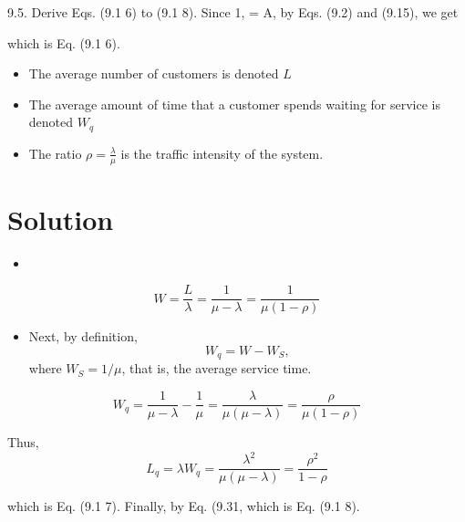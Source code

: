 \documentclass[a4paper12pt]{article}
\begin{document}
\large 




9.5. Derive Eqs. (9.1 6) to (9.1 8). 
Since 1, = A, by Eqs. (9.2) and (9.15), we get 

which is Eq. (9.1 6).

\begin{framed}
\begin{itemize}
\item The average number of customers is denoted $L$
\item The average amount of time that a customer spends waiting for service is denoted $W_q$
    \item  The ratio ${\rho = \frac{\lambda}{\mu}}$ is the traffic intensity of the system.
\end{itemize}
\end{framed}
\section*{Solution}
\begin{itemize}
    \item 
\end{itemize}
\[W =  \frac{L}{\lambda} = \frac{1}{\mu - \lambda } = \frac{1}{\mu(1-\rho)}\]
\begin{itemize}
    \item Next, by definition, 
\[W_q = W - W_S,\] 
where $\displaystyle {W_S = 1/\mu}$, that is, the average service time. 
\end{itemize}
\[{ \displaystyle W_q =   \frac{1}{\mu - \lambda } - \frac{1}{\mu }   = \frac{\lambda}{\mu(\mu - \lambda) } = \frac{\rho}{\mu(1- \rho) }
}\]

Thus, 
\[{ \displaystyle L_q =  \lambda W_q =   \frac{\lambda^2}{\mu(\mu - \lambda) } =\frac{\rho^2}{1- \rho }
}\]


which is Eq. (9.1 7). Finally, by Eq. (9.31, 
which is Eq. (9.1 8). 
\end{document}
